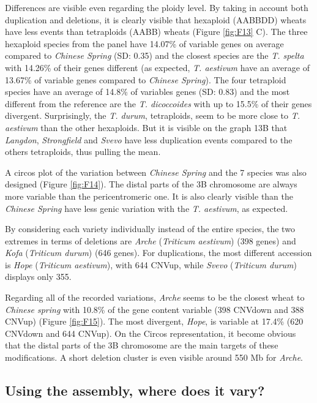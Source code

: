 \documentclass[a4paper, 12pt]{article}
\begin{document}
\begin{onehalfspace}
Differences are visible even regarding the ploidy level. By taking in account both duplication and deletions, it is clearly visible that hexaploid (AABBDD) wheats have less events  than tetraploids (AABB) wheats (Figure \ref{fig:F13} C). The three hexaploid species from the panel have 14.07\% of variable genes on average compared to \textit{Chinese Spring} (SD: 0.35) and the closest species are the \textit{T. spelta} with 14.26\% of their genes different (as expected, \textit{T. aestivum} have an average of 13.67\% of variable genes compared to \textit{Chinese Spring}). The four tetraploid species have an average of 14.8\% of variables genes (SD: 0.83) and the most different from the reference are the \textit{T. dicoccoides} with up to 15.5\% of their genes divergent. Surprisingly, the \textit{T. durum}, tetraploids, seem to be more close to \textit{T. aestivum} than the other hexaploids. But it is visible on the graph 13B that \textit{Langdon}, \textit{Strongfield} and \textit{Svevo} have less duplication events compared to the others tetraploids, thus pulling the mean.

A circos plot of the variation between \textit{Chinese Spring} and the 7 species was also designed (Figure \ref{fig:F14}). The distal parts of the 3B chromosome are always more variable than the pericentromeric one. It is also clearly visible than the \textit{Chinese Spring} have less genic variation with the \textit{T. aestivum}, as expected.

By considering each variety individually instead of the entire species, the two extremes in terms of deletions are \textit{Arche} (\textit{Triticum aestivum}) (398 genes) and \textit{Kofa} (\textit{Triticum durum}) (646 genes). For duplications, the most different accession is \textit{Hope} (\textit{Triticum aestivum}), with 644 CNVup, while  \textit{Svevo} (\textit{Triticum durum}) displays only 355.

Regarding all of the recorded variations, \textit{Arche} seems to be the closest wheat to \textit{Chinese spring} with 10.8\% of the gene content variable (398 CNVdown and 388 CNVup) (Figure \ref{fig:F15}). The most divergent, \textit{Hope}, is variable at 17.4\%  (620 CNVdown and 644 CNVup). On the Circos representation, it become obvious that the distal parts of the 3B chromosome are the main targets of these modifications. A short deletion cluster is even visible around 550 Mb for \textit{Arche}.

        \subsection{Using the assembly, where does it vary?}
        

\end{onehalfspace}
\end{document}
